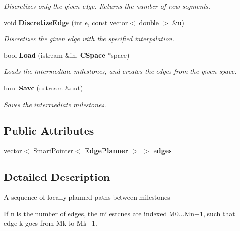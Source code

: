 \begin{DoxyCompactItemize}
\begin{DoxyCompactList}\small\item\em Discretizes only the given edge. Returns the number of new segments. \end{DoxyCompactList}\item 
void {\bf Discretize\+Edge} (int e, const vector$<$ double $>$ \&u)\label{classMilestonePath_a4b06ba022f6f48d8b418d0318f3c8282}

\begin{DoxyCompactList}\small\item\em Discretizes the given edge with the specified interpolation. \end{DoxyCompactList}\item 
bool {\bf Load} (istream \&in, {\bf C\+Space} $\ast$space)\label{classMilestonePath_a1b9c83a24c2ca6454e16c97ae62016de}

\begin{DoxyCompactList}\small\item\em Loads the intermediate milestones, and creates the edges from the given space. \end{DoxyCompactList}\item 
bool {\bf Save} (ostream \&out)\label{classMilestonePath_ac65606d8d23d4be900f26cf7e9d7023e}

\begin{DoxyCompactList}\small\item\em Saves the intermediate milestones. \end{DoxyCompactList}\end{DoxyCompactItemize}
\subsection*{Public Attributes}
\begin{DoxyCompactItemize}
\item 
vector$<$ Smart\+Pointer$<$ {\bf Edge\+Planner} $>$ $>$ {\bfseries edges}\label{classMilestonePath_a3940f3bbac7cb31447ad45f0d42cbd3c}

\end{DoxyCompactItemize}


\subsection{Detailed Description}
A sequence of locally planned paths between milestones. 

If n is the number of edges, the milestones are indexed M0...Mn+1, such that edge k goes from Mk to Mk+1. 


